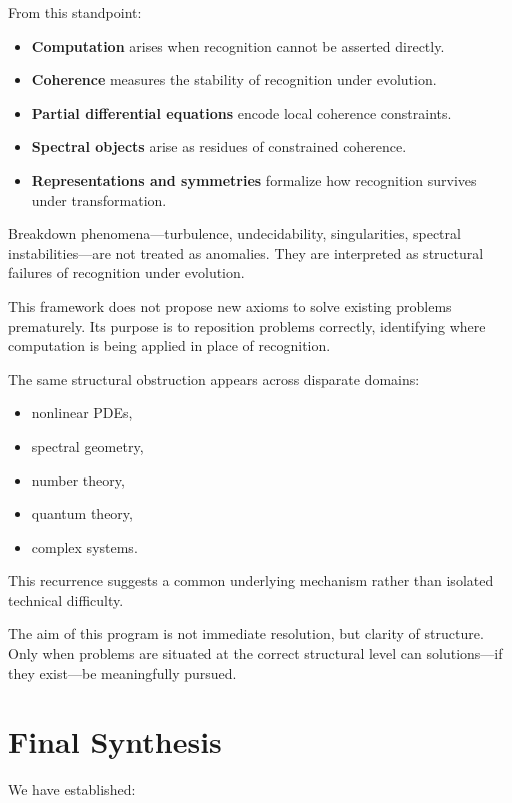 \documentclass[12pt, oneside]{article}
\begin{document}
From this standpoint:
\begin{itemize}
    \item \textbf{Computation} arises when recognition cannot be asserted directly.
    \item \textbf{Coherence} measures the stability of recognition under evolution.
    \item \textbf{Partial differential equations} encode local coherence constraints.
    \item \textbf{Spectral objects} arise as residues of constrained coherence.
    \item \textbf{Representations and symmetries} formalize how recognition survives under transformation.
\end{itemize}

Breakdown phenomena—turbulence, undecidability, singularities, spectral instabilities—are not treated as anomalies. They are interpreted as structural failures of recognition under evolution.

This framework does not propose new axioms to solve existing problems prematurely. Its purpose is to reposition problems correctly, identifying where computation is being applied in place of recognition.

The same structural obstruction appears across disparate domains:
\begin{itemize}
    \item nonlinear PDEs,
    \item spectral geometry,
    \item number theory,
    \item quantum theory,
    \item complex systems.
\end{itemize}

This recurrence suggests a common underlying mechanism rather than isolated technical difficulty.

The aim of this program is not immediate resolution, but clarity of structure. Only when problems are situated at the correct structural level can solutions—if they exist—be meaningfully pursued.

\section{Final Synthesis}

We have established:
\end{document}
